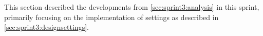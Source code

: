 This section described the developments from \cref{sec:sprint3:analysis} in this sprint, primarily focusing on the implementation of settings as described in \cref{sec:sprint3:designsettings}.